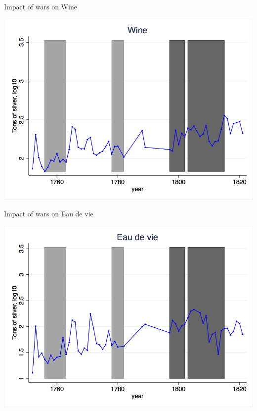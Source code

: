 \documentclass[11pt]{beamer}
\begin{document}
\begin{frame}{Impact of wars on Wine}
\begin{center}
\includegraphics[scale=.3]{wine.png}
\end{center}
\end{frame}

\begin{frame}{Impact of wars on Eau de vie}
\begin{center}
\includegraphics[scale=.3]{eau_de_vie.png}
\end{center}
\end{frame}
\end{document}
